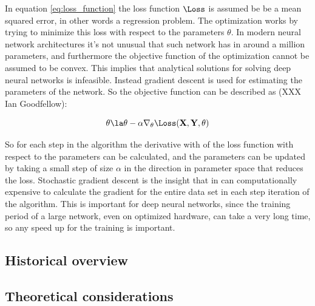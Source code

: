 In equation \eqref{eq:loss_function} the loss function $\Loss$ is assumed be be a mean squared error, in other words a regression problem. The optimization works by trying to minimize this loss with respect to the parameters $\theta$. In modern neural network architectures it's not unusual that such network has in around a million parameters, and furthermore the objective function of the optimization cannot be assumed to be convex. This implies that analytical solutions for solving deep neural networks is infeasible. Instead gradient descent is used for estimating the parameters of the network. So the objective function can be described as (XXX Ian Goodfellow):

\begin{equation}
    \theta \la \theta - \alpha \nabla_{\theta} \Loss(\textbf{X}, \textbf{Y}, \theta)
\end{equation}

So for each step in the algorithm the derivative with of the loss function with respect to the parameters can be calculated, and the parameters can be updated by taking a small step of size $\alpha$ in the direction in parameter space that reduces the loss. Stochastic gradient descent is the insight that in can computationally expensive to calculate the gradient for the entire data set in each step iteration of the algorithm. This is important for deep neural networks, since the training period of a large network, even on optimized hardware, can take a very long time, so any speed up for the training is important. 





\subsection{Historical overview}

\subsection{Theoretical considerations}




